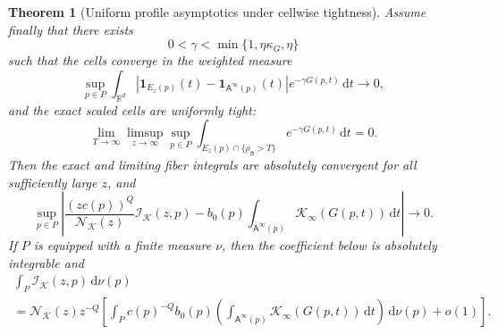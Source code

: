 \documentclass[11pt]{amsart}
\numberwithin{equation}{section}
\newtheorem{theorem}{Theorem}[section]
\theoremstyle{definition}
\theoremstyle{remark}
\newcommand{\R}{\mathbb{R}}
\newcommand{\ind}{\mathbf{1}}
\newcommand{\dd}{\,\mathrm{d}}
\newcommand{\cI}{\mathcal{I}}
\newcommand{\Afib}{\mathsf{A}}
\begin{document}
\begin{theorem}[Uniform profile asymptotics under cellwise tightness]
Assume finally that there exists
\begin{equation}\label{eq:profile-gamma-range}
 0<\gamma<\min\{1,\eta\kappa_G,\eta\}
\end{equation}
such that the cells converge in the weighted measure
\begin{equation}\label{eq:profile-cell-convergence}
 \sup_{p\in P}\int_{\R^d}
 \left|\ind_{E_z(p)}(t)-\ind_{\Afib^\infty(p)}(t)\right|
 e^{-\gamma G(p,t)}\dd t\longrightarrow0,
\end{equation}
and the exact scaled cells are uniformly tight:
\begin{equation}\label{eq:profile-cell-tightness}
 \lim_{T\to\infty}\limsup_{z\to\infty}\sup_{p\in P}
 \int_{E_z(p)\cap\{\rho_{\bm\beta}>T\}}
 e^{-\gamma G(p,t)}\dd t=0.
\end{equation}
Then the exact and limiting fiber integrals are absolutely convergent for all
sufficiently large $z$, and
\begin{equation}\label{eq:uniform-profile-leading}
 \sup_{p\in P}\left|
 \frac{(zc(p))^Q}{\mathcal N_{\mathcal K}(z)}\cI_{\mathcal K}(z,p)
 -b_0(p)\int_{\Afib^\infty(p)}\mathcal K_\infty(G(p,t))\dd t
 \right|\longrightarrow0.
\end{equation}
If $P$ is equipped with a finite measure $\nu$, then the coefficient below is
absolutely integrable and
\begin{multline}\label{eq:integrated-profile-leading}
 \int_P\cI_{\mathcal K}(z,p)\dd\nu(p)\\
 =\mathcal N_{\mathcal K}(z)z^{-Q}\left[
 \int_P c(p)^{-Q}b_0(p)
 \left(\int_{\Afib^\infty(p)}\mathcal K_\infty(G(p,t))\dd t\right)
 \dd\nu(p)+o(1)\right].
\end{multline}
\end{theorem}
\end{document}
